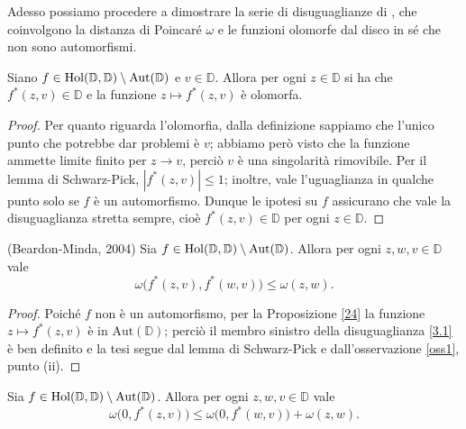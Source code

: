 Adesso possiamo procedere a dimostrare la serie di disuguaglianze di \cite{BM}, che coinvolgono la distanza di Poincaré $\omega$ e le funzioni olomorfe dal disco in sé che non sono automorfismi.

\begin{prop} \label{24}
  Siano $f \in \text{\normalfont{Hol}}(\mathbb{D},\mathbb{D})\setminus\text{\normalfont{Aut}}(\mathbb{D})$ e $v \in \mathbb{D}$. Allora per ogni $z \in \mathbb{D}$ si ha che $f^*(z,v) \in \mathbb{D}$ e la funzione $z \longmapsto f^*(z,v)$ è olomorfa.
\end{prop}

\begin{proof}
  Per quanto riguarda l'olomorfia, dalla definizione sappiamo che l'unico punto che potrebbe dar problemi è $v$; abbiamo però visto che la funzione ammette limite finito per $z \longrightarrow v$, perciò $v$ è una singolarità rimovibile. Per il lemma di Schwarz-Pick, $|f^*(z,v)| \le 1$; inoltre, vale l'uguaglianza in qualche punto solo se $f$ è un automorfismo. Dunque le ipotesi su $f$ assicurano che vale la disuguaglianza stretta sempre, cioè $f^*(z,v) \in \mathbb{D}$ per ogni $z \in \mathbb{D}$.
\end{proof}

\begin{thm} \label{31}
  (Beardon-Minda, 2004) Sia $f \in \text{\normalfont{Hol}}(\mathbb{D},\mathbb{D})\setminus\text{\normalfont{Aut}}(\mathbb{D})$. Allora per ogni $z, w, v \in \mathbb{D}$ vale
  \begin{equation} \label{3.1}
    \omega\bigl(f^*(z,v),f^*(w,v)\bigr) \le \omega(z,w).
  \end{equation}
\end{thm}

\begin{proof}
  Poiché $f$ non è un automorfismo, per la Proposizione \ref{24} la funzione $z \longmapsto f^*(z,v)$ è in $\text{Aut}(\mathbb{D})$; perciò il membro sinistro della disuguaglianza \eqref{3.1} è ben definito e la tesi segue dal lemma di Schwarz-Pick e dall'osservazione \ref{oss1}, punto (ii).
\end{proof}

\begin{cor} \label{32}
  Sia $f \in \text{\normalfont{Hol}}(\mathbb{D},\mathbb{D})\setminus\text{\normalfont{Aut}}(\mathbb{D})$. Allora per ogni $z, w, v \in \mathbb{D}$ vale
  \begin{equation}
    \omega\bigl(0, f^*(z,v)\bigr) \le \omega\bigl(0,f^*(w,v)\bigr)+\omega(z,w).
  \end{equation}
\end{cor}

